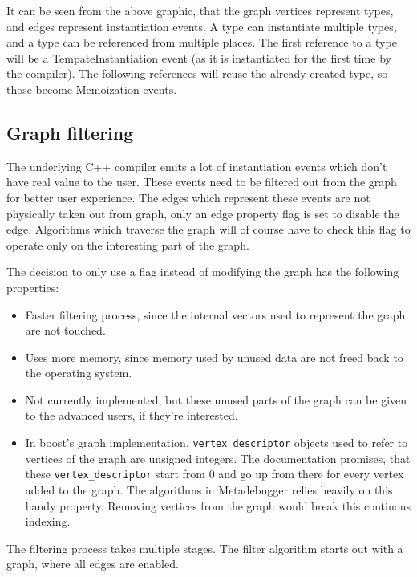 It can be seen from the above graphic, that the graph vertices represent types,
and edges represent instantiation events. A type can instantiate multiple
types, and a type can be referenced from multiple places. The first reference
to a type will be a TempateInstantiation event (as it is instantiated for the
first time by the compiler). The following references will reuse the already
created type, so those become Memoization events.

\subsection{Graph filtering} \label{graph-filtering}

The underlying C++ compiler emits a lot of instantiation events which don't
have real value to the user. These events need to be filtered out from the
graph for better user experience. The edges which represent these events are
not physically taken out from graph, only an edge property flag is set to
disable the edge. Algorithms which traverse the graph will of course have to
check this flag to operate only on the interesting part of the graph.

The decision to only use a flag instead of modifying the graph has the
following properties:

\begin{itemize}
    \item
        Faster filtering process, since the internal vectors used to represent
        the graph are not touched.
    \item
        Uses more memory, since memory used by unused data are not freed back
        to the operating system.
    \item
        Not currently implemented, but these unused parts of the graph can be
        given to the advanced users, if they're interested.
    \item
        In boost's graph implementation, \verb|vertex_descriptor|
        objects used to refer to vertices of the graph are unsigned integers.
        The documentation promises, that these \verb|vertex_descriptor|
        start from 0 and go up from there for every vertex added to the graph.
        The algorithms in Metadebugger relies heavily on this handy property.
        Removing vertices from the graph would break this continous indexing.
\end{itemize}

The filtering process takes multiple stages. The filter algorithm starts out
with a graph, where all edges are enabled.

